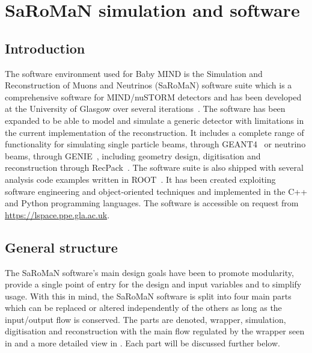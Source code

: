 \chapter{SaRoMaN simulation and software}
\label{c:software}

\section{Introduction}

The software environment used for Baby MIND is the Simulation and Reconstruction of Muons and Neutrinos (SaRoMaN) software suite which is a comprehensive software for MIND/nuSTORM detectors and has been developed at the University of Glasgow over several iterations~\cite{27Bross,  53Laing, 54NUFACT2016Hallsjo}. The software has been expanded to be able to model and simulate a generic detector with limitations in the current implementation of the reconstruction. It includes a complete range of functionality for simulating single particle beams, through GEANT4~\cite{Geant4} or neutrino beams, through GENIE~\cite{Genie}, including geometry design, digitisation and reconstruction through RecPack~\cite{RecPack}. The software suite is also shipped with several analysis code examples written in ROOT~\cite{Root}. It has been created exploiting software engineering and object-oriented techniques and implemented in the C++ and Python programming languages. The software is accessible on request from \url{https://lspace.ppe.gla.ac.uk}. 

\section{General structure}
The SaRoMaN software's main design goals have been to promote modularity, provide a single point of entry for the design and input variables and to simplify usage. With this in mind, the SaRoMaN software is split into four main parts which can be replaced or altered independently of the others as long as the input/output flow is conserved. The parts are denoted, wrapper, simulation, digitisation and reconstruction with the main flow regulated by the wrapper seen in  and a more detailed view in . Each part will be discussed further below.


